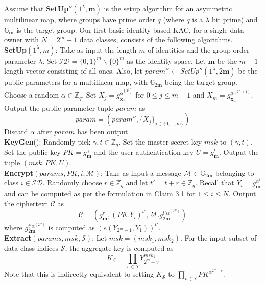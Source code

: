 Assume that \textbf{SetUp}$''(1^{\lambda},\mathbf{m})$ is the setup algorithm for an asymmetric multilinear map, where groups have prime order $q$ (where $q$ is a $\lambda$ bit prime) and $\mathbb{G}_{\mathbf{m}}$ is the target group. Our first basic identity-based KAC, for a single data owner with $N=2^m-1$ data classes, consists of the following algorithms.\\

\noindent\textbf{SetUp}$(1^{\lambda},m)$: Take as input the length $m$ of identities and the group order parameter $\lambda$. Set $\mathcal{ID}=\{0,1\}^m\backslash\{0\}^m$ as the identity space. Let $\mathbf{m}$ be the $m+1$ length vector consisting of all ones. Also, let $param''\leftarrow SetUp''(1^{\lambda},2\mathbf{m})$ be the public parameters for a multilinear map, with $\mathbb{G}_{2\mathbf{m}}$ being the target group. Choose a random $\alpha\in \mathbb{Z}_q$. Set $X_j=g^{\alpha^{(2^j)}}_{\mathbf{x}_j}$ for $0\leq j\leq m-1$ and $X_m=g^{\alpha^{(2^m+1)}}_{\mathbf{x}_m}$. Output the public parameter tuple $param$ as
\begin{equation}
 param = (param'',\{X_j\}_{j\in\{0,\cdots,m\}})\nonumber
\end{equation}
\noindent Discard $\alpha$ after $param$ has been output.\\

\noindent \textbf{KeyGen}(): Randomly pick $\gamma, t \in \mathbb{Z}_q$. Set the master secret key $msk$ to $(\gamma,t)$. Set the public key $PK=g^{\gamma}_{\mathbf{m}}$ and the user authentication key $U=g^{t}_{\mathbf{m}}$. Output the tuple $(msk,PK,U)$.\\

\noindent \textbf{Encrypt}$(params,PK,i,\mathcal{M})$: Take as input a message $\mathcal{M} \in \mathbb{G}_{2\mathbf{m}}$ belonging to class $i \in \mathcal{ID}$. Randomly choose $r\in\mathbb{Z}_q$ and let $t'=t+r \in\mathbb{Z}_q$. Recall that $Y_i=g^{\alpha^i}_{\mathbf{m}}$ and can be computed as per the formulation in Claim 3.1 for $1\leq i\leq N$. Output the ciphertext $\mathcal{C}$ as 
\begin{equation}
 \mathcal{C}=\left(g^r_{\mathbf{m}},(PK.Y_i)^{t'},\mathcal{M}.g^{t'\alpha^{(2^m)}}_{2\mathbf{m}}\right)\nonumber
\end{equation}
\noindent where $g^{t'\alpha^{(2^m)}}_{2\mathbf{m}}$ is computed as $\left(e(Y_{2^m-1},Y_1)\right)^{t'}$.\\

\noindent \textbf{Extract}$(params,msk,\mathcal{S})$: Let $msk=(msk_1,msk_2)$. For the input subset of data class indices $\mathcal{S}$, the aggregate key is computed as 
\begin{equation}
 K_{\mathcal{S}} = \prod_{v\in\mathcal{S}}Y^{msk_1}_{2^m-v}\nonumber
\end{equation} 
\noindent Note that this is indirectly equivalent to setting $K_{\mathcal{S}}$ to $\prod_{v\in\mathcal{S}}PK^{\alpha^{2^m-v}}$.\\
 
